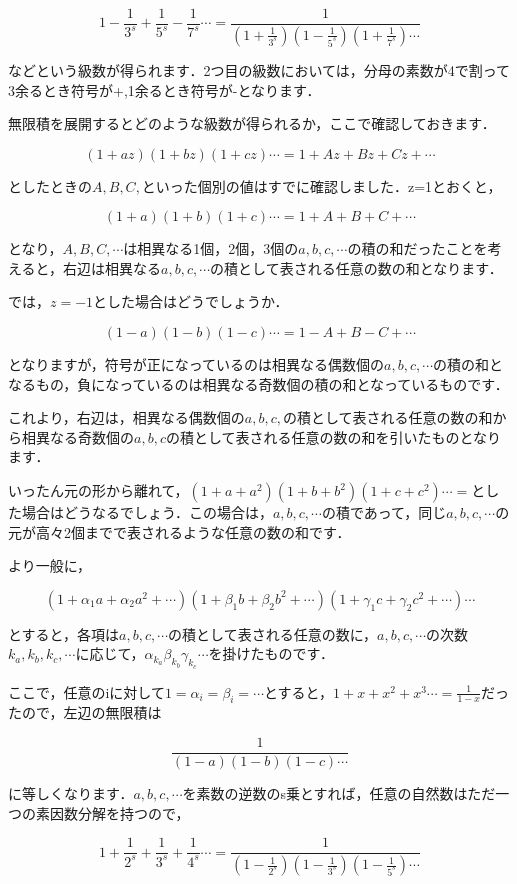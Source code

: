 \documentclass[./main]{subfiles}
\theoremstyle{break}
\begin{document}
\[1-\frac{1}{3^s}+\frac{1}{5^s}-\frac{1}{7^s}\cdots =\frac{1}{\left( 1+\frac{1}{3^s} \right)\left( 1-\frac{1}{5^s} \right)\left( 1+\frac{1}{7^s} \right)\cdots}\]

などという級数が得られます．2つ目の級数においては，分母の素数が4で割って3余るとき符号が+,1余るとき符号が-となります．

無限積を展開するとどのような級数が得られるか，ここで確認しておきます．

\[(1+az)(1+bz)(1+cz)\cdots=1+Az+Bz+Cz+\cdots\]

としたときの$A,B,C,$といった個別の値はすでに確認しました．z=1とおくと，

\[(1+a)(1+b)(1+c)\cdots=1+A+B+C+\cdots\]

となり，$A,B,C,\cdots$は相異なる1個，2個，3個の$a,b,c,\cdots$の積の和だったことを考えると，右辺は相異なる$a,b,c,\cdots$の積として表される任意の数の和となります．

では，$z=-1$とした場合はどうでしょうか．

\[(1-a)(1-b)(1-c)\cdots=1-A+B-C+\cdots\]

となりますが，符号が正になっているのは相異なる偶数個の$a,b,c,\cdots$の積の和となるもの，負になっているのは相異なる奇数個の積の和となっているものです．

これより，右辺は，相異なる偶数個の$a,b,c,$の積として表される任意の数の和から相異なる奇数個の$a,b,c$の積として表される任意の数の和を引いたものとなります．

いったん元の形から離れて，$(1+a+a^2)(1+b+b^2)(1+c+c^2)\cdots=$とした場合はどうなるでしょう．この場合は，$a,b,c,\cdots$の積であって，同じ$a,b,c,\cdots$の元が高々2個までで表されるような任意の数の和です．

より一般に，

\[(1+\alpha_1a+\alpha_2a^2+\cdots)(1+\beta_1b+\beta_2b^2+\cdots)(1+\gamma_1c+\gamma_2c^2+\cdots)\cdots\]

とすると，各項は$a,b,c,\cdots$の積として表される任意の数に，$a,b,c,\cdots$の次数$k_a,k_b,k_c,\cdots$に応じて，$\alpha_{k_a}\beta_{k_b}\gamma_{k_c}\cdots$を掛けたものです．

ここで，任意のiに対して$1=\alpha_i=\beta_i=\cdots$とすると，$1+x+x^2+x^3\cdots=\frac{1}{1-x}$だったので，左辺の無限積は

\[\frac{1}{(1-a)(1-b)(1-c)\cdots}\]

に等しくなります．$a,b,c,\cdots$を素数の逆数のs乗とすれば，任意の自然数はただ一つの素因数分解を持つので，

\[1+\frac{1}{2^s}+\frac{1}{3^s}+\frac{1}{4^s}\cdots =\frac{1}{\left( 1-\frac{1}{2^s} \right)\left( 1-\frac{1}{3^s} \right)\left( 1-\frac{1}{5^s} \right)\cdots}\]
\end{document}

